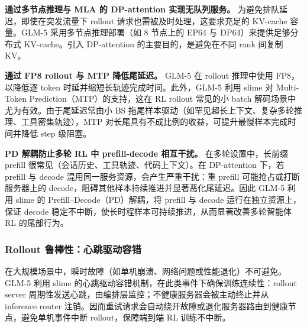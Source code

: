 \textbf{通过多节点推理与 MLA 的 DP-attention 实现无队列服务。}
为避免排队延迟，即使在突发流量下 rollout 请求也需被及时处理，这要求充足的 KV-cache 容量。GLM-5 采用多节点推理部署（如 8 节点上的 EP64 与 DP64）来提供足够分布式 KV-cache。引入 DP-attention 的主要目的，是避免在不同 rank 间复制 KV。

\textbf{通过 FP8 rollout 与 MTP 降低尾延迟。}
GLM-5 在 rollout 推理中使用 FP8，以降低逐 token 时延并缩短长轨迹完成时间。此外，GLM-5 利用 slime 对 Multi-Token Prediction（MTP）的支持，这在 RL rollout 常见的小 batch 解码场景中尤为有效。由于尾延迟常由小 BS 拖尾样本驱动（如罕见超长上下文、复杂多轮推理、工具密集轨迹），MTP 对长尾具有不成比例的收益，可提升最慢样本完成时间并降低 step 级阻塞。

\textbf{PD 解耦防止多轮 RL 中 prefill-decode 相互干扰。}
在多轮设置中，长前缀 prefill 很常见（会话历史、工具轨迹、代码上下文）。在 DP-attention 下，若 prefill 与 decode 混用同一服务资源，会产生严重干扰：重 prefill 可能抢占或打断服务器上的 decode，阻碍其他样本持续推进并显著恶化尾延迟。因此 GLM-5 利用 slime 的 Prefill--Decode（PD）解耦，将 prefill 与 decode 运行在独立资源上，保证 decode 稳定不中断，使长时程样本可持续推进，从而显著改善多轮智能体 RL 的尾部行为。

\subsubsection{Rollout 鲁棒性：心跳驱动容错}

在大规模场景中，瞬时故障（如单机崩溃、网络问题或性能退化）不可避免。GLM-5 利用 slime 的心跳驱动容错机制，在此类事件下确保训练连续性：rollout server 周期性发送心跳，由编排层监控；不健康服务器会被主动终止并从 inference router 注销。因而重试请求会自动绕开故障或退化服务器路由到健康节点，避免单机事件中断 rollout，保障端到端 RL 训练不中断。
